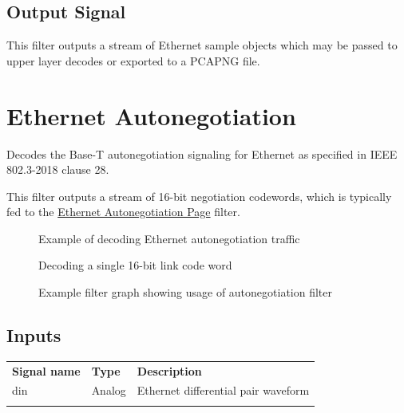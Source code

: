 \subsection{Output Signal}

This filter outputs a stream of Ethernet sample objects which may be passed to upper layer decodes or exported to a
PCAPNG file.

\pagebreak
\section{Ethernet Autonegotiation}
\label{filter:aneg}

Decodes the Base-T autonegotiation signaling for Ethernet as specified in IEEE 802.3-2018 clause 28.

This filter outputs a stream of 16-bit negotiation codewords, which is typically fed to the
\hyperref[filter:anegpage]{Ethernet Autonegotiation Page} filter.

\begin{figure}[h]
\centering
{}
\caption{Example of decoding Ethernet autonegotiation traffic}
\label{filter_ethernet_aneg}
\end{figure}

\begin{figure}[h]
\centering
{}
\caption{Decoding a single 16-bit link code word}
\label{filter_ethernet_aneg_2}
\end{figure}

\begin{figure}[h]
\centering
{}
\caption{Example filter graph showing usage of autonegotiation filter}
\label{filter_aneg}
\end{figure}

\FloatBarrier

\subsection{Inputs}

\begin{tabularx}{16cm}{llX}
\thickhline
\textbf{Signal name} & \textbf{Type} & \textbf{Description} \\
\thickhline
din & Analog & Ethernet differential pair waveform\\
\thickhline
\end{tabularx}

